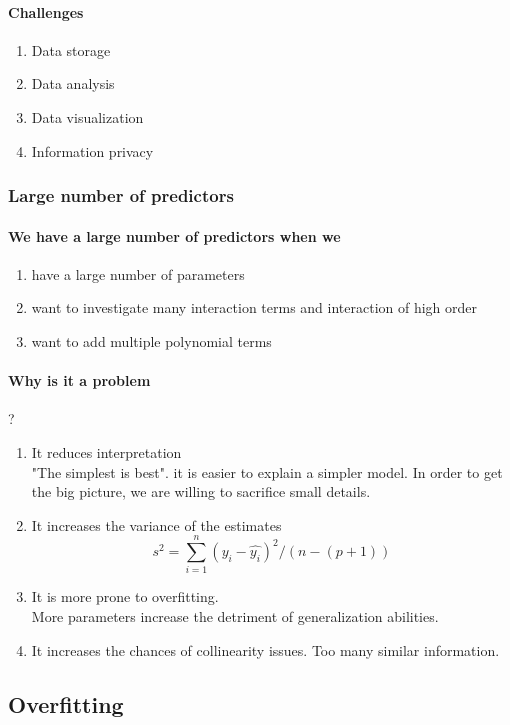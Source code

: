 \documentclass[11pt]{article}
\begin{document}
\paragraph{Challenges}
\begin{enumerate}
	\item Data storage
	\item Data analysis
	\item Data visualization
	\item Information privacy
\end{enumerate}

\subsubsection{Large number of predictors}
\paragraph{We have a large number of predictors when we}
\begin{enumerate}
	\item have a large number of parameters
	\item want to investigate many interaction terms and interaction of high order
	\item want to add multiple polynomial terms
\end{enumerate}

\paragraph{Why is it a problem}?
\begin{enumerate}
	\item It reduces interpretation \\
	"The simplest is best". it is easier to explain a simpler model. In order to get the big picture, we are willing to sacrifice small details.
	\item It increases the variance of the estimates
	$$ s^2 = \sum_{i=1}^n (y_i - \hat{y_i})^2 / (n- (p+1))$$
	\item It is more prone to overfitting.\\
	More parameters increase the detriment of generalization abilities.
	\item It increases the chances of collinearity issues. 
	Too many similar information.
\end{enumerate}
\subsection{Overfitting}
\end{document}
